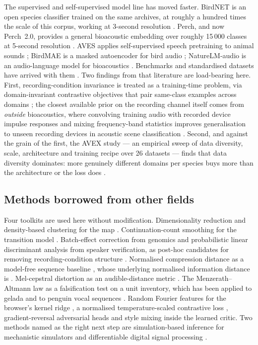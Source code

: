 \documentclass[10pt,twocolumn,a4paper]{article}
\begin{document}
The supervised and self-supervised model line has moved faster. BirdNET is an open
species classifier trained on the same archives, at roughly a hundred times the scale of
this corpus, working at 3-second resolution \citep{birdnet2021}. Perch, and now Perch~2.0,
provides a general bioacoustic embedding over roughly 15\,000 classes at 5-second
resolution \citep{perch2}. AVES applies self-supervised speech pretraining to animal
sounds \citep{aves2022}; BirdMAE is a masked autoencoder for bird
audio \citep{birdmae2025}; NatureLM-audio is an audio-language model for
bioacoustics \citep{naturelm2024}. Benchmarks and standardised datasets have arrived with
them \citep{beans2022,birdset2024}. Two findings from that literature are load-bearing
here. First, recording-condition invariance is treated as a training-time problem, via
domain-invariant contrastive objectives that pair same-class examples across
domains \citep{moummad2024}; the closest available prior on the recording channel itself comes
from \emph{outside} bioacoustics, where convolving training audio with recorded device impulse
responses and mixing frequency-band statistics improves generalisation to unseen recording
devices in acoustic scene classification \citep{morocutti2023}. Second, and against the grain
of the first, the AVEX study --- an empirical sweep of data diversity, scale, architecture and
training recipe over 26 datasets --- finds that data diversity dominates: more genuinely
different domains per species buys more than the architecture or the loss
does \citep{avex2025}.

\subsection{Methods borrowed from other fields}

Four toolkits are used here without modification. Dimensionality reduction and
density-based clustering for the map \citep{umap2018,hdbscan2013}. Continuation-count
smoothing for the transition model \citep{kneser1995}. Batch-effect correction from
genomics and probabilistic linear discriminant analysis from speaker verification, as
post-hoc candidates for removing recording-condition
structure \citep{korsunsky2019,prince2007}. Normalised compression distance as a
model-free sequence baseline \citep{cilibrasi2005}, whose underlying normalised information
distance is \citet{li2004}. Mel-cepstral distortion as an audible-distance
metric \citep{kubichek1993}. The Menzerath--Altmann law as a falsification test on a unit
inventory, which has been applied to gelada and to penguin vocal
sequences \citep{gustison2016,favaro2020}. Random Fourier features for the browser's kernel
ridge \citep{rff2007}, a normalised temperature-scaled contrastive
loss \citep{simclr2020}, gradient-reversal adversarial heads \citep{ganin2016} and
style mixing \citep{zhou2021mixstyle} inside the learned critic. Two methods named as the
right next step are simulation-based inference for mechanistic
simulators \citep{cranmer2020} and differentiable digital signal
processing \citep{ddsp2020}.
\end{document}
